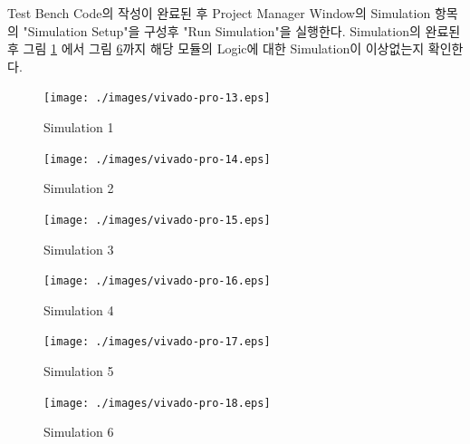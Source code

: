 \documentclass[11pt
  , a4paper
  , article
  , oneside
]{memoir}
\begin{document}
\clearpage

Test Bench Code의 작성이 완료된 후 Project Manager Window의 Simulation 항목의 "Simulation Setup"을 구성후 "Run Simulation"을
실행한다. Simulation의 완료된 후 그림 \ref{fig:sim_1} 에서 그림 \ref{fig:sim_6}까지 해당 모듈의 Logic에 대한 Simulation이 이상없는지 확인한다.

\begin{figure}[h!]
	\centering
	\texttt{[image: ./images/vivado-pro-13.eps]}
	\caption{Simulation 1}
	\label{fig:sim_1} 
\end{figure}

\begin{figure}[h!]
	\centering
	\texttt{[image: ./images/vivado-pro-14.eps]}
	\caption{Simulation 2}
	\label{fig:sim_2} 
\end{figure}

\begin{figure}[h!]
	\centering
	\texttt{[image: ./images/vivado-pro-15.eps]}
	\caption{Simulation 3}
	\label{fig:sim_3} 
\end{figure}

\begin{figure}[h!]
	\centering
	\texttt{[image: ./images/vivado-pro-16.eps]}
	\caption{Simulation 4}
	\label{fig:sim_4} 
\end{figure}

\begin{figure}[h!]
	\centering
	\texttt{[image: ./images/vivado-pro-17.eps]}
	\caption{Simulation 5}
	\label{fig:sim_5} 
\end{figure}

\begin{figure}[h!]
	\centering
	\texttt{[image: ./images/vivado-pro-18.eps]}
	\caption{Simulation 6}
	\label{fig:sim_6} 
\end{figure}



\clearpage


\end{document}
